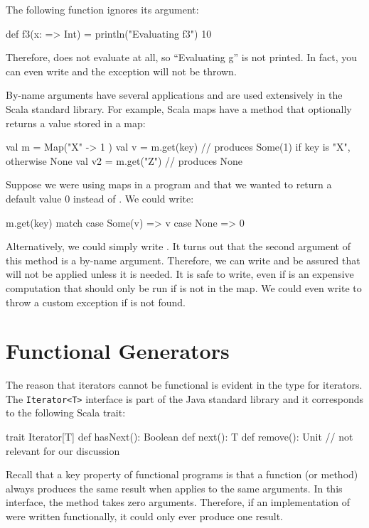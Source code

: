 The following function ignores its argument:
\begin{scalacode}
def f3(x: => Int) = {
  println("Evaluating f3")
  10
}
\end{scalacode}

Therefore,  does not evaluate 
at all, so ``Evaluating g'' is not printed. In fact, you can even
write  and the exception
will not be thrown.

By-name arguments have several applications and are used extensively in the
Scala standard library. For example, Scala maps have a  method
that optionally returns a value stored in a map:
\begin{scalacode}
val m = Map("X" -> 1 )
val v = m.get(key) // produces Some(1) if key is "X", otherwise None
val v2 = m.get("Z") // produces None
\end{scalacode}
Suppose we were using maps in a program and that we wanted to return a default value 0
instead of . We could write:
\begin{scalacode}
m.get(key) match {
  case Some(v) => v
  case None => 0
}
\end{scalacode}
Alternatively, we could simply write . It turns out
that the second argument of this method is a by-name argument. Therefore, we can
write  and be assured that  will not
be applied unless it is needed. It is safe to write, even if  is
an expensive computation that should only be run if  is not
in the map. We could even write 
to throw a custom exception if  is not found.

\section{Functional Generators}

The reason that iterators cannot be functional is evident in the type for iterators. The
\verb|Iterator<T>| interface is part of the Java standard library and it corresponds to
the following Scala trait:
\begin{scalacode}
trait Iterator[T] {
  def hasNext(): Boolean
  def next(): T
  def remove(): Unit // not relevant for our discussion
}
\end{scalacode}
Recall that a key property of functional programs is that a function (or method) always produces
the same result when applies to the same arguments. In this interface, the  method
takes zero arguments. Therefore, if an implementation of  were written
functionally, it could only ever produce one result.

